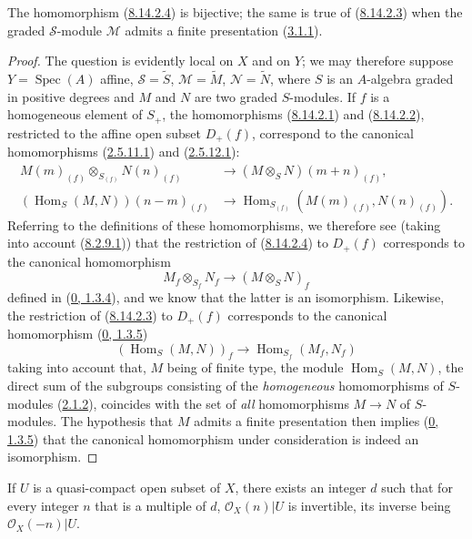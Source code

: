 \begin{proposition}[8.14.3]
\label{II.8.14.3}
The homomorphism (\hyperref[II.8.14.2.4]{8.14.2.4}) is bijective; the
same is true of (\hyperref[II.8.14.2.3]{8.14.2.3}) when the
graded $\mathcal{S}$-module $\mathcal{M}$ admits a finite presentation
(\hyperref[II.3.1.1]{3.1.1}).
\end{proposition}

\begin{proof}
The question is evidently local on $X$ and on $Y$; we may therefore suppose
$Y=\operatorname{Spec}(A)$ affine, $\mathcal{S}=\widetilde{S}$,
$\mathcal{M}=\widetilde{M}$, $\mathcal{N}=\widetilde{N}$, where $S$ is an
$A$-algebra graded in positive degrees and $M$ and $N$ are two graded
$S$-modules. If $f$ is a homogeneous element of $S_+$, the homomorphisms
(\hyperref[II.8.14.2.1]{8.14.2.1}) and
(\hyperref[II.8.14.2.2]{8.14.2.2}), restricted to the affine open subset
$D_+(f)$, correspond to the canonical homomorphisms
(\hyperref[II.2.5.11.1]{2.5.11.1}) and
(\hyperref[II.2.5.12.1]{2.5.12.1}):
\begin{align*}
  M(m)_{(f)}\otimes_{S_{(f)}}N(n)_{(f)}
  &\to(M\otimes_S N)(m+n)_{(f)},\\
  (\operatorname{Hom}_S(M,N))(n-m)_{(f)}
  &\to\operatorname{Hom}_{S_{(f)}}(M(m)_{(f)},N(n)_{(f)}).
\end{align*}
Referring to the definitions of these homomorphisms, we therefore see (taking
into account (\hyperref[II.8.2.9.1]{8.2.9.1})) that the restriction of
(\hyperref[II.8.14.2.4]{8.14.2.4}) to $D_+(f)$ corresponds to
the canonical homomorphism
\[
  M_f\otimes_{S_f}N_f\to(M\otimes_S N)_f
\]
defined in (\hyperref[0.1.3.4]{0, 1.3.4}), and we know that the latter is
an isomorphism. Likewise, the restriction of
(\hyperref[II.8.14.2.3]{8.14.2.3}) to $D_+(f)$ corresponds to
the canonical homomorphism (\hyperref[0.1.3.5]{0, 1.3.5})
\[
  (\operatorname{Hom}_S(M,N))_f\to
  \operatorname{Hom}_{S_f}(M_f,N_f)
\]
taking into account that, $M$ being of finite type, the module
$\operatorname{Hom}_S(M,N)$, the direct sum of the subgroups consisting of the
\emph{homogeneous} homomorphisms of $S$-modules
(\hyperref[II.2.1.2]{2.1.2}), coincides with the set of \emph{all}
homomorphisms $M\to N$ of $S$-modules. The hypothesis that $M$ admits a
finite presentation then implies (\hyperref[0.1.3.5]{0, 1.3.5}) that
the canonical homomorphism under consideration is indeed an isomorphism.
\end{proof}

\begin{proposition}[8.14.4]
\label{II.8.14.4}
If $U$ is a quasi-compact open subset of $X$, there exists an integer $d$
such that for every integer $n$ that is a multiple of $d$,
$\mathcal{O}_X(n)|U$ is invertible, its inverse being
$\mathcal{O}_X(-n)|U$.
\end{proposition}

